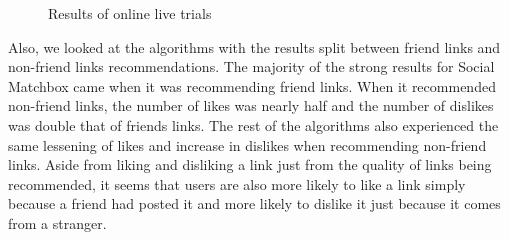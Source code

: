 \begin{figure}[h!]
\centering
{}
\caption{Results of online live trials}
\end{figure}

Also, we looked at the algorithms with the results split between friend links and non-friend links recommendations. The majority of the strong results for Social Matchbox came when it was recommending friend links. When it recommended non-friend links, the number of likes was nearly half and the number of dislikes was double that of friends links. The rest of the algorithms also experienced the same lessening of likes and increase in dislikes when recommending non-friend links. Aside from liking and disliking a link just from the quality of links being recommended, it seems that users are also more likely to like a link simply because a friend had posted it and more likely to dislike it just because it comes from a stranger.

